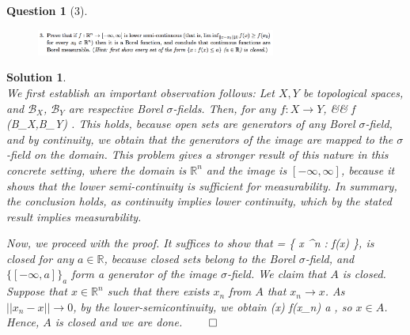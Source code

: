 \documentclass{article} %
\def\eQb#1\eQe{\begin{eqnarray*}#1\end{eqnarray*}}
\theoremstyle{quest}
\newtheorem*{question}{Question}
\newtheorem*{solution}{Solution}
\begin{document}
\newpage

\begin{question}[3]
\hfill
\begin{figure}[h!]
  \centering
    \includegraphics[width=0.7\textwidth]{problim-e1-p3.png}
\end{figure}
\end{question}
\begin{solution} \hfill \\
We first establish an important observation follows: 
Let $X,Y$ be topological spaces,
and $\mathscr{B}_X$, $\mathscr{B}_Y$ are respective Borel $\sigma$-fields. Then,
for any $f: X \to Y$, 
\eQb
f  &\implies& f  (B_X,B_Y) .
\eQe
This holds, because open sets are generators of any Borel $\sigma$-field, and
by continuity, we obtain that the generators of the image are mapped to
the $\sigma$-field on the domain. This problem gives a stronger result of this nature
in this concrete setting, where the domain is $\mathbb{R}^n$ and the image is $[-\infty,
\infty]$, because it shows that the lower semi-continuity is sufficient for 
measurability. In summary, the conclusion holds, as continuity implies
lower continuity, which by the stated result implies measurability.
 
\bigskip
Now, we proceed with the proof. It suffices to show that 
\eQb
A = \{ x \in {}^n : \> f(x) \leq \alpha \},
\eQe
is closed for any $a \in \mathbb{R}$, because closed sets 
belong to the Borel $\sigma$-field, and $\{[-\infty,a]\}_{a}$ form a generator 
of the image $\sigma$-field. We claim that $A$ is closed. Suppose that
$x \in \mathbb{R}^n$ such that there exists $x_n$ from $A$ that $x_n \to x$.
As $||x_n - x|| \to 0$, by the lower-semicontinuity, we obtain
\eQb
f(x) \leq \liminf f(x_n) \leq a ,
\eQe 
so $x \in A$. Hence, $A$ is closed and we are done. \hfill $\qed$
\end{solution}

\newpage 
\end{document}
